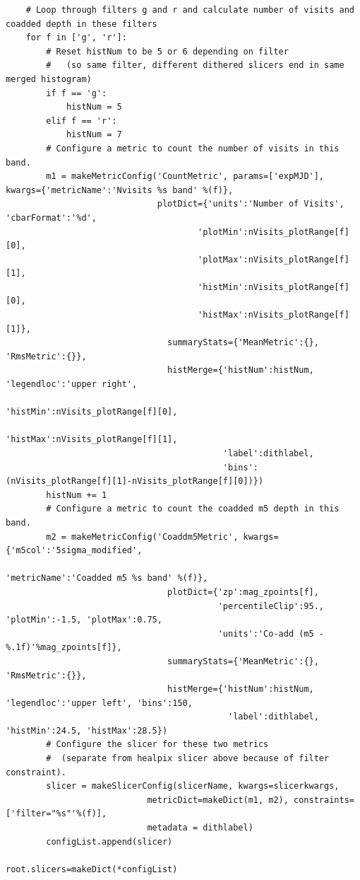 \documentclass[]{spie}  %
\begin{document}
\begin{lstlisting}
    # Loop through filters g and r and calculate number of visits and coadded depth in these filters
    for f in ['g', 'r']:
        # Reset histNum to be 5 or 6 depending on filter
        #   (so same filter, different dithered slicers end in same merged histogram)
        if f == 'g':
            histNum = 5
        elif f == 'r':
            histNum = 7
        # Configure a metric to count the number of visits in this band.
        m1 = makeMetricConfig('CountMetric', params=['expMJD'], kwargs={'metricName':'Nvisits %s band' %(f)},
                              plotDict={'units':'Number of Visits', 'cbarFormat':'%d',
                                      'plotMin':nVisits_plotRange[f][0],
                                      'plotMax':nVisits_plotRange[f][1],
                                      'histMin':nVisits_plotRange[f][0],
                                      'histMax':nVisits_plotRange[f][1]},
                                summaryStats={'MeanMetric':{}, 'RmsMetric':{}},
                                histMerge={'histNum':histNum, 'legendloc':'upper right',
                                           'histMin':nVisits_plotRange[f][0],
                                           'histMax':nVisits_plotRange[f][1],
                                           'label':dithlabel,
                                           'bins':(nVisits_plotRange[f][1]-nVisits_plotRange[f][0])})
        histNum += 1
        # Configure a metric to count the coadded m5 depth in this band.
        m2 = makeMetricConfig('Coaddm5Metric', kwargs={'m5col':'5sigma_modified',
                                                       'metricName':'Coadded m5 %s band' %(f)},
                                plotDict={'zp':mag_zpoints[f],
                                          'percentileClip':95., 'plotMin':-1.5, 'plotMax':0.75,
                                          'units':'Co-add (m5 - %.1f)'%mag_zpoints[f]},
                                summaryStats={'MeanMetric':{}, 'RmsMetric':{}},
                                histMerge={'histNum':histNum, 'legendloc':'upper left', 'bins':150,
                                            'label':dithlabel, 'histMin':24.5, 'histMax':28.5})
        # Configure the slicer for these two metrics
        #  (separate from healpix slicer above because of filter constraint).
        slicer = makeSlicerConfig(slicerName, kwargs=slicerkwargs, 
                            metricDict=makeDict(m1, m2), constraints=['filter="%s"'%(f)],
                            metadata = dithlabel)
        configList.append(slicer)

root.slicers=makeDict(*configList)
\end{lstlisting}
\end{document}
